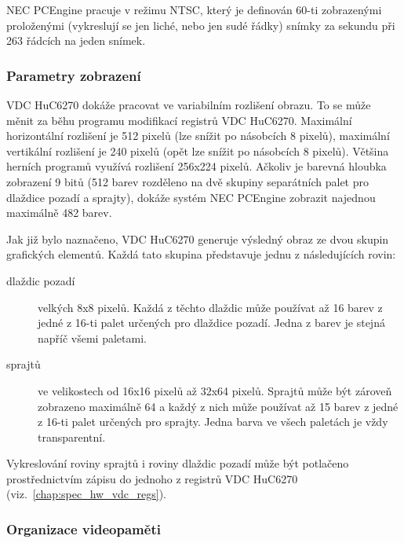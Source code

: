 NEC PCEngine pracuje v režimu NTSC, který je definován 60-ti zobrazenými
proloženými (vykreslují se jen liché, nebo jen sudé řádky) snímky za sekundu
při 263 řádcích na jeden snímek.~\cite{Vit02}


\subsubsection{Parametry zobrazení}\label{chap:spec_hw_vdc_display}

VDC HuC6270 dokáže pracovat ve variabilním rozlišení obrazu. To se může měnit
za běhu programu modifikací registrů VDC HuC6270. Maximální horizontální
rozlišení je 512 pixelů (lze snížit po násobcích 8 pixelů), maximální
vertikální rozlišení je 240 pixelů (opět lze snížit po násobcích 8 pixelů).
Většina herních programů využívá rozlišení 256x224 pixelů. Ačkoliv je barevná
hloubka zobrazení 9 bitů (512 barev rozděleno na dvě skupiny separátních palet
pro dlaždice pozadí a sprajty), dokáže systém NEC PCEngine zobrazit najednou
maximálně 482 barev.~\cite{wwwWikiTurboGrafx, Schleussinger98}

Jak již bylo naznačeno, VDC HuC6270 generuje výsledný obraz ze dvou skupin
grafických elementů. Každá tato skupina představuje jednu z následujících
rovin:

\begin{description}
\item[dlaždic pozadí] velkých 8x8 pixelů. Každá z těchto dlaždic může používat
	až 16 barev z jedné z 16-ti palet určených pro dlaždice pozadí. Jedna z
	barev je stejná napříč všemi paletami.

\item[sprajtů] ve velikostech od 16x16 pixelů až 32x64 pixelů. Sprajtů může být
	zároveň zobrazeno maximálně 64 a každý z nich může používat až 15 barev z
	jedné z 16-ti palet určených pro sprajty. Jedna barva ve všech paletách je
	vždy transparentní.
\end{description}

Vykreslování roviny sprajtů i roviny dlaždic pozadí může být potlačeno
prostřednictvím zápisu do jednoho z registrů VDC HuC6270
(viz.~\ref{chap:spec_hw_vdc_regs}).


\subsubsection{Organizace videopaměti}\label{chap:spec_hw_vdc_vram}

